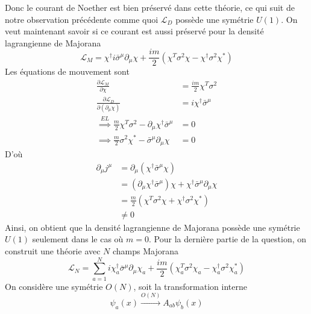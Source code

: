 \documentclass{article}
\numberwithin{equation}{section}
\theoremstyle{solution}
\begin{document}
Donc le courant de Noether est bien préservé dans cette théorie, ce qui suit de notre observation précédente comme 
quoi $\mathcal{L}_D$ possède une symétrie $U(1)$. On veut maintenant savoir si ce courant est aussi préservé pour 
la densité lagrangienne de Majorana
\begin{equation}
        \mathcal{L}_M = 
        \chi^{\dagger} i \bar{\sigma}^{\mu} \partial_\mu \chi + \frac{im}{2}(\chi^T \sigma^{2} \chi - \chi^{\dagger} \sigma^{2}\chi^{*})
\end{equation} 
Les équations de mouvement sont
\begin{align*}
        \frac{\partial \mathcal{L}_M}{\partial \chi} &= \frac{im}{2}\chi^{T}\sigma^{2} \\
        \frac{\partial \mathcal{L}_D}{\partial (\partial_\mu \chi)} &= i\chi^{\dagger}\bar{\sigma}^{\mu} \\
        \overset{EL}{\implies} \frac{m}{2}\chi^{T}\sigma^{2} - \partial_{\mu}\chi^{\dagger}\bar{\sigma}^{\mu} &= 0\\
        \implies \frac{m}{2}\sigma^{2}\chi^{*} - \bar{\sigma}^{\mu}\partial_{\mu}\chi &=  0
\end{align*}
D'où
\begin{align*}
        \partial_\mu j^{\mu} &= \partial_\mu(\chi^{\dagger} \bar{\sigma}^{\mu}\chi) \\
                &= (\partial_\mu \chi^{\dagger} \bar{\sigma}^{\mu}) \chi + \chi^{\dagger}\bar{\sigma}^{\mu} \partial_\mu \chi \\
                &= \frac{m}{2}(\chi^{T}\sigma^{2}\chi + \chi^{\dagger}\sigma^{2}\chi^{*}) \\
                &\not= 0
\end{align*}
Ainsi, on obtient que la densité lagrangienne de Majorana possède une symétrie $U(1)$ seulement dans le cas où $m = 0$.
Pour la dernière partie de la question, on construit une théorie avec $N$ champs Majorana 
\begin{equation}
        \mathcal{L}_N = \sum_{a=1}^{N}
        i\chi^{\dagger}_a  \bar{\sigma}^{\mu} \partial_\mu \chi_a + \frac{im}{2}(\chi^T_a \sigma^{2} \chi_a - \chi^{\dagger}_a \sigma^{2}\chi^{*}_a)
\end{equation} 
On considère une symétrie $O(N)$, soit la transformation interne
\begin{equation}
        \psi_a(x) \overset{O(N)}{\rightarrow } A_{ab}\psi_b(x)
\end{equation} 
\end{document}
